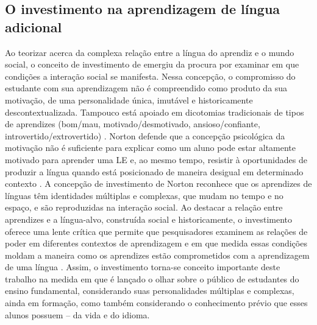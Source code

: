 \documentclass{textolivre}
\begin{document}
\subsection{O investimento na aprendizagem de língua adicional}
Ao teorizar acerca da complexa relação entre a língua do aprendiz e o mundo social, o conceito de investimento de \textcite{norton2013} emergiu da procura por examinar em que condições a interação social se manifesta. Nessa concepção, o compromisso do estudante com sua aprendizagem não é compreendido como produto da sua motivação, de uma personalidade única, imutável e historicamente descontextualizada. Tampouco está apoiado em dicotomias tradicionais de tipos de aprendizes (bom/mau, motivado/desmotivado, ansioso/confiante, introvertido/extrovertido) \cite{darvin2016}. Norton defende que a concepção psicológica da motivação não é suficiente para explicar como um aluno pode estar altamente motivado para aprender uma LE e, ao mesmo tempo, resistir à oportunidades de produzir a língua quando está posicionado de maneira desigual em determinado contexto \cite{darvin2016}. A concepção de investimento de Norton reconhece que os aprendizes de línguas têm identidades múltiplas e complexas, que mudam no tempo e no espaço, e são reproduzidas na interação social. Ao destacar a relação entre aprendizes e a língua-alvo, construída social e historicamente, o investimento oferece uma lente crítica que permite que pesquisadores examinem as relações de poder em diferentes contextos de aprendizagem e em que medida essas condições moldam a maneira como os aprendizes estão comprometidos com a aprendizagem de uma língua \cite{darvin2016}. Assim, o investimento torna-se conceito importante deste trabalho na medida em que é lançado o olhar sobre o público de estudantes do ensino fundamental, considerando suas personalidades múltiplas e complexas, ainda em formação, como também considerando o conhecimento prévio que esses alunos possuem – da vida e do idioma.  
\end{document}
